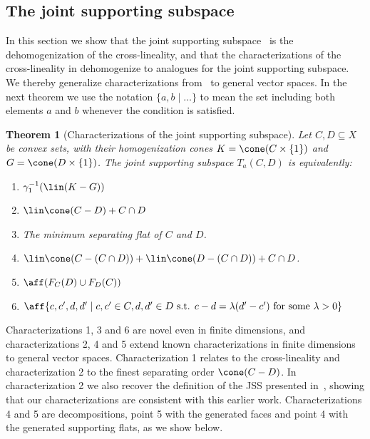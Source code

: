 \documentclass{article}
\theoremstyle{plain}
\newtheorem{theorem}{Theorem}[section]
\theoremstyle{definition}
\theoremstyle{remark}
\begin{document}
\subsection{The joint supporting subspace}
\label{loc:body.lattice_minima.the_joint_supporting_subspace}
In this section we show that the joint supporting subspace~\cite{scottBilateralFacialReduction2026}
is the dehomogenization of the cross-lineality, and that
the characterizations of the cross-lineality in 
dehomogenize to analogues for the joint supporting subspace.
We thereby generalize characterizations from~\cite{scottBilateralFacialReduction2026}
to general vector spaces. In the next theorem we use the notation $\{ a,b \mid \ldots \}$ to mean the set including both elements $a$ and $b$ whenever the condition is satisfied.
\begin{theorem}[Characterizations of the joint supporting subspace]
\label{loc:affine_cross:lineality.statement}
Let $C, D \subseteq X$ be convex sets,
with their homogenization cones $K = \cone(C \times \{ 1 \})$ and $G = \cone(D \times \{ 1 \})$.
The \emph{joint supporting subspace} $T_a(C, D)$ is equivalently:
\begin{enumerate}
\item $\gamma_1^{-1}(\lin(K-G))$
\item $\lin\cone(C-D) + C \cap D$
\item The minimum separating flat of $C$ and $D$.
\item $\lin \cone(C - (C \cap D)) + \lin \cone(D - (C \cap D)) + C \cap D$.
\item $\aff(F_C(D) \cup F_D(C))$
\item $\aff\{ c,c',d,d'\mid c, c'  \in C , d,d'  \in D \text{ s.t. } c-d = \lambda(d'-c') \text{ for some } \lambda > 0\}$
\end{enumerate}
\end{theorem}
Characterizations 1, 3 and 6 are novel even in finite dimensions, and characterizations 2, 4 and 5 extend
known characterizations in finite dimensions~\cite{scottBilateralFacialReduction2026} to general vector spaces.
Characterization 1 relates to the cross-lineality and characterization 2 to the finest separating order $\cone(C-D)$.
In characterization 2 we also recover the definition of the JSS presented in~\cite{scottBilateralFacialReduction2026},
showing that our characterizations are consistent with this earlier work.
Characterizations 4 and 5 are decompositions, point 5 with the generated faces and point 4 with the generated supporting flats, as we show below.
\end{document}
